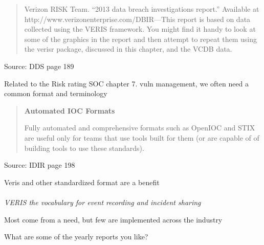 \documentclass[Screen16to9,17pt]{foils}
\begin{document}


\begin{quote}
Verizon RISK Team. “2013 data breach investigations report.” Available at http://www.verizonenterprise.com/DBIR—This report is based on data collected using the VERIS framework. You might find it handy to look at some of the graphics in the report and then attempt to repeat them using the verisr package, discussed in this chapter, and the VCDB data.
\end{quote}
Source: DDS page 189

Related to the Risk rating SOC chapter 7. vuln management, we often need a common format and terminology


\begin{quote}{\bf
Automated IOC Formats}

Fully automated and comprehensive formats such as OpenIOC and STIX are useful only for teams that use tools built for them (or are capable of of building tools to use these standards).
\end{quote}
Source: IDIR page 198


\begin{list2}
\item Veris and other standardized format are a benefit\\
\\
\emph{VERIS the vocabulary for event recording and incident sharing}
\item Most come from a need, but few are implemented across the industry
\end{list2}

\centerline{What are some of the yearly reports you like?}



\begin{quote}

\end{quote}
\end{document}
